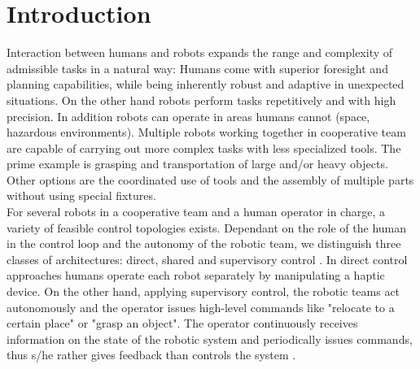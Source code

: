 \documentclass[a4paper,twoside, openright,12pt]{report}
\begin{document}
\chapter{Introduction}

%
Interaction between humans and robots expands the range and complexity of admissible tasks in a natural way: Humans come with superior foresight and planning capabilities, while being inherently robust and adaptive in unexpected situations. On the other hand robots perform tasks repetitively and with high precision. In addition robots can operate in areas humans cannot (space, hazardous environments). Multiple robots working together in cooperative team are capable of carrying out more complex tasks with less specialized tools. The prime example is grasping and transportation of large and/or heavy objects. Other options are the coordinated use of tools and the assembly of multiple parts without using special fixtures.\\
For several robots in a cooperative team and a human operator in charge, a variety of feasible control topologies exists. Dependant on the role of the human in the control loop and the autonomy of the robotic team, we distinguish three classes of architectures: direct, shared and supervisory control \cite{Hirche_12}. In direct control approaches humans operate each robot separately by manipulating a haptic device. On the other hand, applying supervisory control, the robotic teams act autonomously and the operator issues high-level commands like "relocate to a certain place" or "grasp an object". The operator continuously receives information on the state of the robotic system and periodically issues commands, thus s/he rather gives feedback than controls the system \cite{Sheridian_92}.
\end{document}
